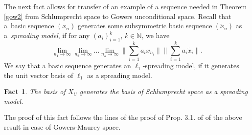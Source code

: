 \documentclass{amsart}
\newtheorem{fact}[theorem]{Fact}
\numberwithin{subsection}{section}
\numberwithin{equation}{section}
\begin{document}
The next fact allows for transfer of an example of a sequence needed in Theorem \ref{gow2} from Schlumprecht space to Gowers unconditional space. Recall that a~basic sequence $(x_n)$ generates some subsymmetric basic sequence $(\tilde{x}_n)$ as a~\textit{spreading model}, if for any $(a_i)_{i=1}^k$, $k\in{{\mathbb{N}}}$, we have
$$
\lim_{n_1\to\infty}\lim_{n_2\to\infty}\dots\lim_{n_k\to\infty}{\lVert \sum_{i=1}^ka_ix_{n_i}\rVert}{\lVert \sum_{i=1}^ka_i\tilde{x}_i\rVert}.
$$
We say that a basic sequence generates an $\ell_1$-spreading model, if it generates the unit vector basis of $\ell_1$ as a spreading model.
\begin{fact}\label{fact3}
 The basis of $X_U$ generates the basis of Schlumprecht space as a spreading model. 
\end{fact}
The proof of this fact follows the lines of the proof of Prop. 3.1. of \cite{AS} of the above result in case of Gowers-Maurey space. 

\
\end{document}
